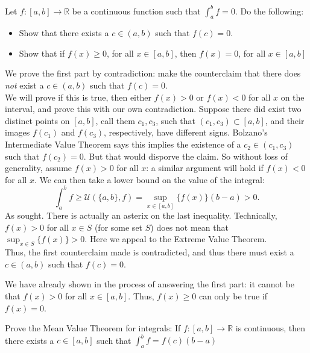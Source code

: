 \documentclass[11 pt]{article}
\begin{document}
\pagebreak
\begin{problem}
	Let $f:[a,b]\to\mathbb{R}$ be a continuous function such that $\int_{a}^{b}f=0$. Do the following:
	\begin{itemize}
		\item Show that there exists a $c\in(a,b)$ such that $f(c)=0$.
		\item Show that if $f(x)\geq 0$, for all $x\in[a,b]$, then $f(x)=0$, for all $x\in[a,b]$
	\end{itemize}
\end{problem}
\begin{solution}
	We prove the first part by contradiction: make the counterclaim that there does \emph{not} exist a $c\in(a,b)$ such that $f(c)=0$.\\
	We will prove if this is true, then either $f(x)>0$ or $f(x)<0$ for all $x$ on the interval, and prove this with our own contradiction.
	Suppose there did exist two distinct points on $[a,b]$, call them $c_1,c_3$, such that $(c_1,c_3)\subset[a,b]$, and their images $f(c_1)$ and $f(c_3)$, respectively, have different signs. Bolzano's Intermediate Value Theorem says this implies the existence of a $c_2\in(c_1,c_3)$ such that $f(c_2)=0$. But that would disporve the claim. So without loss of generality, assume $f(x)>0$ for all $x$: a similar argument will hold if $f(x)<0$ for all $x$.
	We can then take a lower bound on the value of the integral:
	\[
		\int_{a}^{b}f\geq \mathcal{U}(\{a,b\},f)= \sup_{x\in[a,b]}\{f(x)\}(b-a)>0
	.\] 
	As sought. There is actually an asterix on the last inequality. Technically, $f(x)>0$ for all $x\in S$  (for some set $S$) does not mean that $\sup_{x\in S}\{f(x)\}>0$. Here we appeal to the Extreme Value Theorem.\\
	Thus, the first counterclaim made is contradicted, and thus there must exist a $c\in(a,b)$ such that $f(c)=0$.
\end{solution}
\begin{solution}
	We have already shown in the process of answering the first part: it cannot be that $f(x)>0$ for all $x\in[a,b]$. Thus, $f(x)\geq 0$ can only be true if $f(x)=0$.
\end{solution}
\pagebreak
\begin{problem}
	Prove the Mean Value Theorem for integrals: If $f:[a,b]\to\mathbb{R}$ is continuous, then there exists a $c\in[a,b]$ such that $\int_{a}^{b}f=f(c)(b-a)$
\end{problem}
\end{document}
